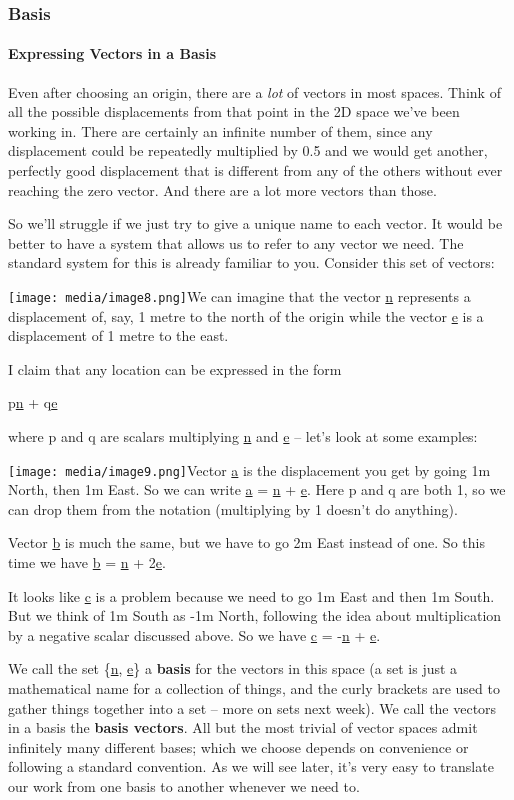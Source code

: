 \documentclass[oneside,english]{amsbook}
\numberwithin{section}{chapter}
\theoremstyle{plain}
\theoremstyle{definition}
\begin{document}
\subsubsection{Basis}

\paragraph{Expressing Vectors in a Basis}

Even after choosing an origin, there are a \emph{lot} of vectors in most
spaces. Think of all the possible displacements from that point in the
2D space we've been working in. There are certainly an infinite number
of them, since any displacement could be repeatedly multiplied by 0.5
and we would get another, perfectly good displacement that is different
from any of the others without ever reaching the zero vector. And there
are a lot more vectors than those.

So we'll struggle if we just try to give a unique name to each vector.
It would be better to have a system that allows us to refer to any
vector we need. The standard system for this is already familiar to you.
Consider this set of vectors:

\texttt{[image: media/image8.png]}We
can imagine that the vector \ul{n} represents a displacement of, say, 1
metre to the north of the origin while the vector \ul{e} is a
displacement of 1 metre to the east.

I claim that any location can be expressed in the form

p\ul{n} + q\ul{e}

where p and q are scalars multiplying \ul{n} and \ul{e} -- let's look at
some examples:

\texttt{[image: media/image9.png]}Vector
\ul{a} is the displacement you get by going 1m North, then 1m East. So
we can write \ul{a} = \ul{n} + \ul{e}. Here p and q are both 1, so we
can drop them from the notation (multiplying by 1 doesn't do anything).

Vector \ul{b} is much the same, but we have to go 2m East instead of
one. So this time we have \ul{b} = \ul{n} + 2\ul{e}.

It looks like \ul{c} is a problem because we need to go 1m East and then
1m South. But we think of 1m South as -1m North, following the idea
about multiplication by a negative scalar discussed above. So we have
\ul{c} = -\ul{n} + \ul{e}.

We call the set \{\ul{n}, \ul{e}\} a \textbf{basis} for the vectors in
this space (a set is just a mathematical name for a collection of
things, and the curly brackets are used to gather things together into a
set -- more on sets next week). We call the vectors in a basis the
\textbf{basis vectors}. All but the most trivial of vector spaces admit
infinitely many different bases; which we choose depends on convenience
or following a standard convention. As we will see later, it's very easy
to translate our work from one basis to another whenever we need to.
\end{document}
